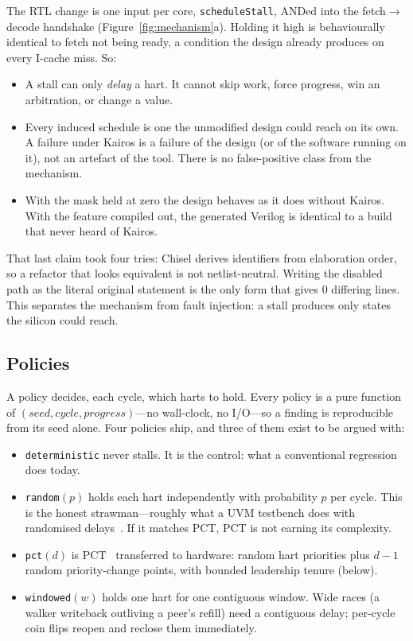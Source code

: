 \documentclass[sigconf,anonymous,review]{acmart}
\begin{document}
The RTL change is one input per core, \texttt{scheduleStall}, ANDed
into the fetch$\rightarrow$decode handshake (Figure~\ref{fig:mechanism}a). Holding it high is behaviourally identical to fetch not being
ready, a condition the design already produces on every I-cache miss.
So:

\begin{itemize}
\item A stall can only \emph{delay} a hart. It cannot skip work, force
  progress, win an arbitration, or change a value.
\item Every induced schedule is one the unmodified design could reach
  on its own. A failure under Kairos is a failure of the design (or of
  the software running on it), not an artefact of the tool. There is
  no false-positive class from the mechanism.
\item With the mask held at zero the design behaves as it does without
  Kairos. With the feature compiled out, the generated Verilog is
  identical to a build that never heard of Kairos.
\end{itemize}

That last claim took four tries: Chisel derives identifiers from
elaboration order, so a refactor that looks equivalent is not
netlist-neutral. Writing the disabled path as the literal original
statement is the only form that gives 0 differing lines. This
separates the mechanism from fault injection: a stall produces only
states the silicon could reach.

\subsection{Policies}
\label{sec:policies}

A policy decides, each cycle, which harts to hold. Every policy is a
pure function of $(\textit{seed}, \textit{cycle}, \textit{progress})$---no
wall-clock, no I/O---so a finding is reproducible from its seed alone.
Four policies ship, and three of them exist to be argued with:

\begin{itemize}
\item \texttt{deterministic} never stalls. It is the control: what a
  conventional regression does today.
\item \texttt{random}$(p)$ holds each hart independently with
  probability $p$ per cycle. This is the honest strawman---roughly
  what a UVM testbench does with randomised delays~\cite{ieee1800uvm}.
  If it matches PCT, PCT is not earning its complexity.
\item \texttt{pct}$(d)$ is PCT~\cite{burckhardt2010pct} transferred to
  hardware: random hart priorities plus $d{-}1$ random priority-change
  points, with bounded leadership tenure (below).
\item \texttt{windowed}$(w)$ holds one hart for one contiguous window.
  Wide races (a walker writeback outliving a peer's refill) need a
  contiguous delay; per-cycle coin flips reopen and reclose them
  immediately.
\end{itemize}
\end{document}
